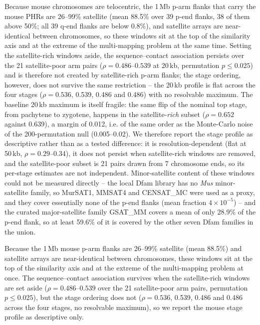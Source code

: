 Because mouse chromosomes are telocentric, the 1\,Mb p-arm flanks that carry the
mouse PHRs are 26--99\% satellite (mean 88.5\% over 39 p-end flanks, 38 of them
above 50\%; all 39 q-end flanks are below 0.8\%), and satellite arrays are
near-identical between chromosomes, so these windows sit at the top of the
similarity axis and at the extreme of the multi-mapping problem at the same
time. Setting the satellite-rich windows aside, the sequence--contact
association persists over the 21 satellite-poor arm pairs ($\rho = 0.486$--$0.539$
at 20\,kb, permutation $p \leq 0.025$) and is therefore not created by
satellite-rich p-arm flanks; the stage ordering, however, does not survive the
same restriction -- the 20\,kb profile is flat across the four stages
($\rho = 0.536$, 0.539, 0.486 and 0.486) with no resolvable maximum. The
baseline 20\,kb maximum is itself fragile: the same flip of the nominal top
stage, from pachytene to zygotene, happens in the satellite-\emph{rich} subset
($\rho = 0.652$ against 0.639), a margin of 0.012, i.e. of the same order as the
Monte-Carlo noise of the 200-permutation null (0.005--0.02). We therefore report
the stage profile as descriptive
rather than as a tested difference: it is resolution-dependent (flat at
50\,kb, $\rho = 0.29$--0.34), it does not persist when satellite-rich windows
are removed, and the satellite-poor subset is 21 pairs drawn from 7 chromosome
ends, so its per-stage estimates are not independent. Minor-satellite content of
these windows could not be measured directly -- the local Dfam library has no
\emph{Mus} minor-satellite family, so MurSAT1, MMSAT4 and CENSAT\_MC were used
as a proxy, and they cover essentially none of the p-end flanks (mean fraction
$4\times10^{-5}$) -- and the curated major-satellite family GSAT\_MM covers
a mean of only 28.9\% of the p-end flank, so at least 59.6\% of it is covered by
the other seven Dfam families in the union.

Because the 1\,Mb mouse p-arm flanks are 26--99\% satellite (mean 88.5\%) and
satellite arrays are near-identical between chromosomes, these windows sit at
the top of the similarity axis and at the extreme of the multi-mapping problem
at once. The sequence--contact association survives when the satellite-rich
windows are set aside ($\rho = 0.486$--$0.539$ over the 21 satellite-poor arm
pairs, permutation $p \leq 0.025$), but the stage ordering does not
($\rho = 0.536$, 0.539, 0.486 and 0.486 across the four stages, no resolvable
maximum), so we report the mouse stage profile as descriptive only.

